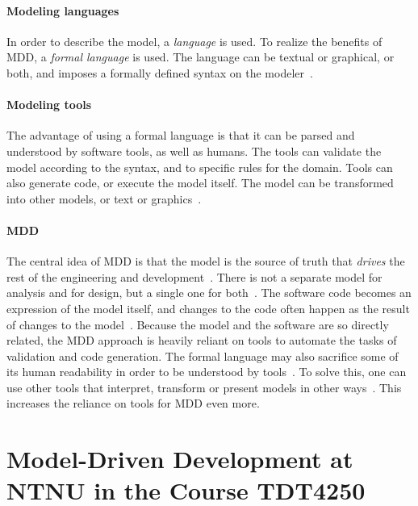 \paragraph{Modeling languages}
In order to describe the model, a \textit{language} is used.
To realize the benefits of \acrshort{MDD}, a \textit{formal language} is used.
The language can be textual or graphical, or both, and imposes a formally defined syntax on the modeler~\cite[p.~13]{brambillaModeldrivenSoftwareEngineering2012}.

\paragraph{Modeling tools}
The advantage of using a formal language is that it can be parsed and understood by software tools, as well as humans.
The tools can validate the model according to the syntax, and to specific rules for the domain.
Tools can also generate code, or execute the model itself.
The model can be transformed into other models, or text or graphics~\cite[p.~8]{brambillaModeldrivenSoftwareEngineering2012}.

\paragraph{\acrlong{MDD}}
The central idea of \acrlong{MDD} is that the model is the source of truth that \textit{drives} the rest of the engineering and development~\cite[p.~9]{brambillaModeldrivenSoftwareEngineering2012}.
There is not a separate model for analysis and for design, but a single one for both~\cite[p.~49]{evansDomaindrivenDesignTackling2004}.
The software code becomes an expression of the model itself, and changes to the code often happen as the result of changes to the model~\cite[p.~49]{evansDomaindrivenDesignTackling2004}.
Because the model and the software are so directly related, the \acrshort{MDD} approach is heavily reliant on tools to automate the tasks of validation and code generation.
The formal language may also sacrifice some of its human readability in order to be understood by tools~\cite[p.~232]{krogstieModelbasedDevelopmentEvolution2012}.
To solve this, one can use other tools that interpret, transform or present models in other ways~\cite[p.~233]{krogstieModelbasedDevelopmentEvolution2012}.
This increases the reliance on tools for \acrshort{MDD} even more.


\section{Model-Driven Development at NTNU in the Course TDT4250}

